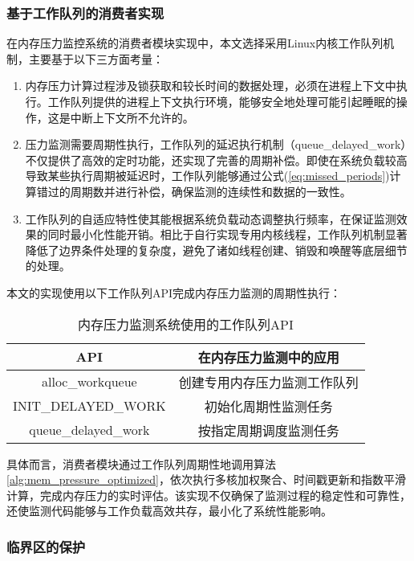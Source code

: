 \subsubsection{基于工作队列的消费者实现}
\label{sec:工作队列}
在内存压力监控系统的消费者模块实现中，本文选择采用Linux内核工作队列机制，主要基于以下三方面考量：
\begin{enumerate}
    \item 内存压力计算过程涉及锁获取和较长时间的数据处理，必须在进程上下文中执行。工作队列提供的进程上下文执行环境，能够安全地处理可能引起睡眠的操作，这是中断上下文所不允许的。
    \item 压力监测需要周期性执行，工作队列的延迟执行机制（queue\_delayed\_work）不仅提供了高效的定时功能，还实现了完善的周期补偿。即使在系统负载较高导致某些执行周期被延迟时，工作队列能够通过公式(\ref{eq:missed_periods})计算错过的周期数并进行补偿，确保监测的连续性和数据的一致性。
    \item 工作队列的自适应特性使其能根据系统负载动态调整执行频率，在保证监测效果的同时最小化性能开销。相比于自行实现专用内核线程，工作队列机制显著降低了边界条件处理的复杂度，避免了诸如线程创建、销毁和唤醒等底层细节的处理。
\end{enumerate}

本文的实现使用以下工作队列API完成内存压力监测的周期性执行：

\begin{table}[htbp]
\centering
\caption{内存压力监测系统使用的工作队列API}
\label{tab:workqueue_api}
\begin{tabular}{cc}
\toprule
\textbf{API} & \textbf{在内存压力监测中的应用} \\
\midrule
alloc\_workqueue & 创建专用内存压力监测工作队列 \\
INIT\_DELAYED\_WORK & 初始化周期性监测任务 \\
queue\_delayed\_work & 按指定周期调度监测任务 \\
\bottomrule
\end{tabular}
\end{table}

具体而言，消费者模块通过工作队列周期性地调用算法\ref{alg:mem_pressure_optimized}，依次执行多核加权聚合、时间戳更新和指数平滑计算，完成内存压力的实时评估。该实现不仅确保了监测过程的稳定性和可靠性，还使监测代码能够与工作负载高效共存，最小化了系统性能影响。

\subsubsection{临界区的保护}

